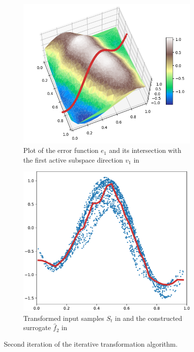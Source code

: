 \documentclass[
  a4paper,  %
  twoside,  %
  bibliography=totoc,
  headsepline,
  cleardoublepage=empty,
  parskip=half,
  draft=false
]{scrbook}
\begin{document}
\begin{mdframed}[style=style]
\begin{figure}[H]
\begin{subfigure}{.5\textwidth}
  \centering
  \includegraphics[width=.85\linewidth]{graphics/pipeline_current_2.png}
  \caption{Plot of the error function $e_1$ and its intersection with the first active subspace direction $v_1$ in \reddot}
\label{fig:pipeline_current_2}
\end{subfigure}%
\begin{subfigure}{.5\textwidth}
  \centering
  \includegraphics[width=.85\linewidth]{graphics/pipeline_local_2}
  \caption{Transformed input samples $S_t$ in \darkblue and the constructed surrogate $\hat{f}_2$ in \reddot}
\label{fig:pipeline_local_2}
\end{subfigure}
\delimit
\caption{Second iteration of the iterative transformation algorithm.}
\label{fig:pipeline_2}
\end{figure}
\end{mdframed}
\end{document}
